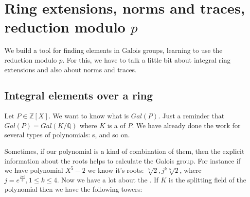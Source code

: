 \chapter{Ring extensions, norms and traces, reduction modulo $p$}
We build a tool for finding elements in Galois groups, learning to use
the reduction modulo $p$. For this, we have to talk a little bit about
integral ring extensions and also about norms and traces.


\section{Integral elements over a ring}

Let $P \in \mathbb{Z}\left[X\right]$. We want to know what is
$Gal\left(P\right)$. Just a reminder that $Gal\left(P\right) =
Gal\left(K/\mathbb{Q}\right)$ where $K$ is a
 of $P$. We have already done the work for
several types of polynomials: s,
 and so on.

Sometimes, if our polynomial is a kind of combination of them, then the
explicit information about the roots helps to calculate the Galois
group. For instance if we have polynomial $X^5 - 2$ we know it's
roots: $\sqrt[5]{2}, j^k \sqrt[5]{2}$, where
$j= e^{\frac{2 \pi i}{5}}, 1 \le k \le 4$. Now we have a lot about the
. If $K$ is the splitting field of the
polynomial then we have the following towers:

  
